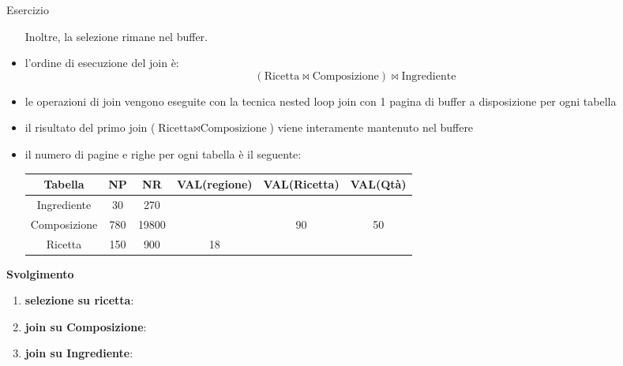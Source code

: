 \begin{esempiobox}{Esercizio}
\begin{itemize}[label=$\circ$, itemsep=\smallskipamount]
        Inoltre, la selezione rimane nel buffer.
        \item l'ordine di esecuzione del join è:
        \[
            (\text{Ricetta} \Join \text{Composizione}) \Join \text{Ingrediente}
        \]
        \item le operazioni di join vengono eseguite con la tecnica nested loop join con 1 pagina di buffer a disposizione per ogni tabella
        \item il risultato del primo join ($\text{Ricetta} \Join \text{Composizione}$) viene interamente mantenuto nel buffere
        \item il numero di pagine e righe per ogni tabella è il seguente:
        \begin{table}[H]
            \centering
            \begin{tabular}{|c|c|c|c|c|c|}
                \hline
                Tabella & NP & NR & VAL(regione) & VAL(Ricetta) & VAL(Qtà)\\
                \hline
                Ingrediente & 30 & 270 & & & \\
                Composizione & 780 & 19800 & & 90 & 50\\
                Ricetta & 150 & 900 & 18 & \\
                \hline
            \end{tabular}
        \end{table}
    \end{itemize}

    \textbf{Svolgimento}
    \begin{enumerate}[itemsep=\medskipamount]
        \item \textbf{selezione su ricetta}:
        \item \textbf{join su Composizione}:
        \item \textbf{join su Ingrediente}:
    \end{enumerate}
\end{esempiobox}

